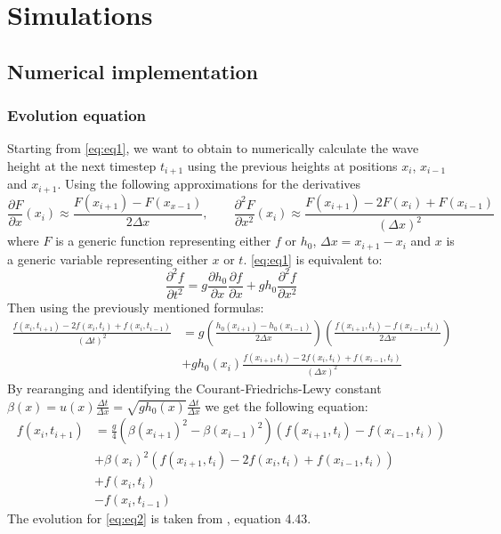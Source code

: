 \section{Simulations}

\subsection{Numerical implementation}

\subsubsection{Evolution equation}

Starting from \autoref{eq:eq1}, we want to obtain to numerically calculate the wave height at the next timestep \(t_{i+1}\) using the previous heights at positions \(x_i\), \(x_{i-1}\) and \(x_{i+1}\). Using the following approximations for the derivatives
\begin{equation}
    \frac{\partial F}{\partial x}(x_i) \approx \frac{F(x_{i+1}) - F(x_{x-1})}{2 \Delta x}
    , \qquad
    \frac{\partial^2 F}{\partial x^2}(x_i) \approx \frac{F(x_{i+1}) - 2 F(x_i) + F(x_{i-1})}{(\Delta x)^2}
\end{equation}
where \(F\) is a generic function representing either \(f\) or \(h_0\), \(\Delta x = x_{i+1} - x_i\) and \(x\) is a generic variable representing either \(x\) or \(t\). \autoref{eq:eq1} is equivalent to:
\begin{equation}
    \frac{\partial^2 f}{\partial t^2} = g \frac{\partial h_0}{\partial x} \frac{\partial f}{\partial x} + g h_0 \frac{\partial^2 f}{\partial x^2}
\end{equation}
Then using the previously mentioned formulas:
\begin{equation}
    \begin{aligned}
        \frac{f(x_i, t_{i+1}) - 2 f(x_i, t_i) + f(x_i, t_{i-1})}{(\Delta t)^2} &= g \left( \frac{h_0(x_{i+1}) - h_0(x_{i-1})}{2 \Delta x} \right) \left( \frac{f(x_{i+1}, t_i) - f(x_{i-1}, t_i)}{2 \Delta x} \right) \\
        &+ g h_0(x_i) \frac{f(x_{i+1}, t_i) - 2 f(x_i, t_i) + f(x_{i-1}, t_i)}{(\Delta x)^2}
    \end{aligned}
\end{equation}
By rearanging and identifying the Courant-Friedrichs-Lewy constant \(\beta(x) = u(x) \frac{\Delta t}{\Delta x} = \sqrt{g h_0(x)} \frac{\Delta t}{\Delta x}\) we get the following equation:
\begin{equation}
    \begin{aligned}
        f(x_i, t_{i+1}) &= \frac{g}{4} \left( \beta(x_{i+1})^2 - \beta(x_{i-1})^2 \right) \left( f(x_{i+1}, t_i) - f(x_{i-1}, t_i) \right) \\
        &+ \beta(x_i)^2 (f(x_{i+1}, t_i) - 2 f(x_i, t_i) + f(x_{i-1}, t_i)) \\
        &+ f(x_i,t_i) \\
        &- f(x_i,t_{i-1})
    \end{aligned}
\end{equation}
The evolution for \autoref{eq:eq2} is taken from \cite{physnumbook}, equation 4.43.

